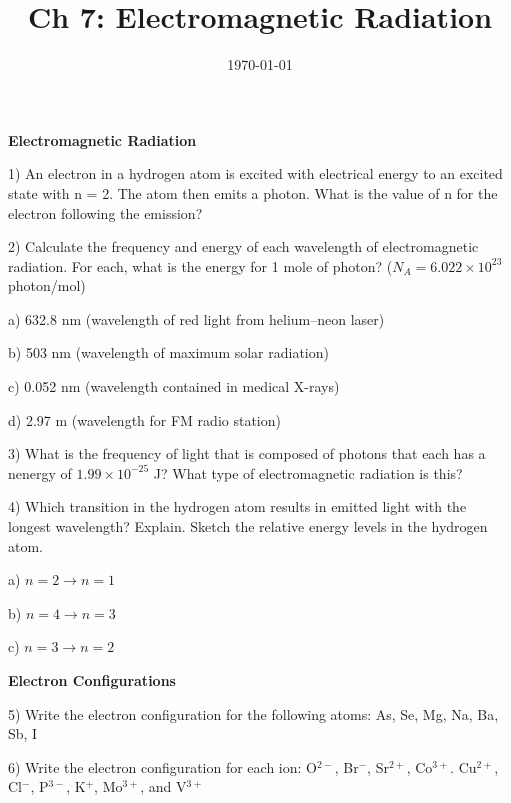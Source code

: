\documentclass[12pt]{article}
\title{\textbf{Ch 7: Electromagnetic Radiation}}
\date{\today}
\begin{document}
\maketitle 

\textbf{Electromagnetic Radiation}

1) An electron in a hydrogen atom is excited with electrical energy to
an excited state with n = 2. The atom then emits a photon. What is
the value of n for the electron following the emission?
\vspace{1in}

2) Calculate the frequency and energy of each wavelength of electromagnetic
radiation. For each, what is the energy for 1 mole of photon? ($N_A = 6.022\times 10^{23}$ photon/mol) 

a) 632.8 nm (wavelength of red light from helium–neon laser)

b) 503 nm (wavelength of maximum solar radiation)

c) 0.052 nm (wavelength contained in medical X-rays)

d) 2.97 m (wavelength for FM radio station)

\vspace{1in}

3) What is the frequency of light that is composed of photons that each
has a nenergy of $1.99\times 10^{-25}$ J? What type of electromagnetic
radiation is this?
\newpage

4) Which transition in the hydrogen atom results in emitted light with
the longest wavelength? Explain. Sketch the relative energy levels in the
hydrogen atom.

a) $n = 2 \rightarrow n = 1$

b) $n = 4 \rightarrow n = 3$

c) $n = 3 \rightarrow n = 2$
\vspace{1in}

\textbf{Electron Configurations}

5) Write the electron configuration for the following atoms:
As, Se, Mg, Na, Ba, Sb, I
\vspace{2in}

6) Write the electron configuration for each ion:
O$^{2-}$, Br$^-$, Sr$^{2+}$, Co$^{3+}$. Cu$^{2+}$, Cl$^-$, P$^{3-}$,
K$^+$, Mo$^{3+}$, and V$^{3+}$
\end{document}
